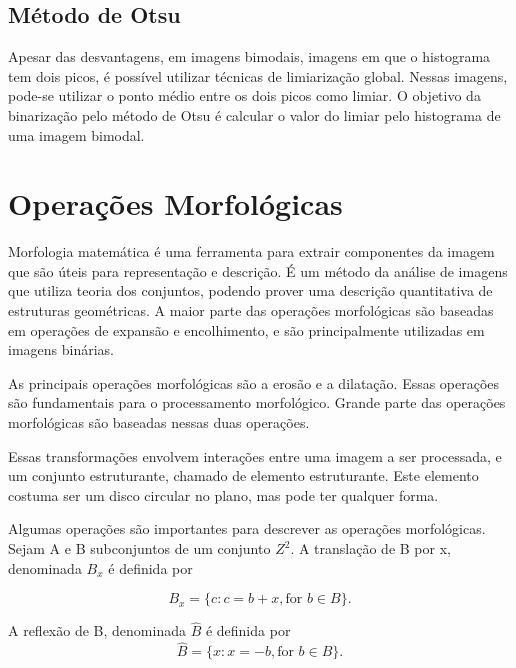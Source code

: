 \subsection{Método de Otsu}
\label{sec:otsu}

Apesar das desvantagens, em imagens bimodais, imagens em que o histograma tem dois picos, é possível utilizar técnicas de limiarização global. Nessas imagens, pode-se utilizar o ponto médio entre os dois picos como limiar. O objetivo da binarização pelo método de Otsu é calcular o valor do limiar pelo histograma de uma imagem bimodal.\cite{opencv2014thresh}

\section{Operações Morfológicas}
\label{sec:morfologicas}

Morfologia matemática é uma ferramenta para extrair componentes da imagem que são úteis para representação e descrição. É um método da análise de imagens que utiliza teoria dos conjuntos, podendo prover uma descrição quantitativa de estruturas geométricas. A maior parte das operações morfológicas são baseadas em operações de expansão e encolhimento, e são principalmente utilizadas em imagens binárias. \cite{owens1997morphology}

As principais operações morfológicas são a erosão e a dilatação. Essas operações são fundamentais para o processamento morfológico. Grande parte das operações morfológicas são baseadas nessas duas operações. \cite{gonzalez1977digital}

Essas transformações envolvem interações entre uma imagem a ser processada, e um conjunto estruturante, chamado de elemento estruturante. Este elemento costuma ser um disco circular no plano, mas pode ter qualquer forma.\cite{owens1997morphology}

Algumas operações são importantes para descrever as operações morfológicas. Sejam A e B subconjuntos de um conjunto \(Z^2\). A translação de B por x, denominada \(B_x\) é definida por

\begin{displaymath}
B_x = \{c : c = b + x, \mbox{for } b \in B\}. 
\end{displaymath}

A reflexão de B, denominada $\hat{B}$ é definida por
\begin{displaymath}
\hat{B} = \{x : x = -b, \mbox{for } b \in B\}. 
\end{displaymath}

